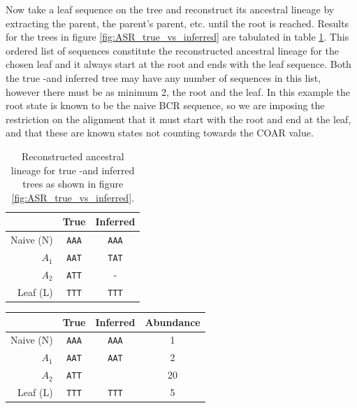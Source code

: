 Now take a leaf sequence on the tree and reconstruct its ancestral lineage by extracting the parent, the parent's parent, etc. until the root is reached.
Results for the trees in figure \ref{fig:ASR_true_vs_inferred} are tabulated in table \ref{true_vs_inferred_table}.
This ordered list of sequences constitute the reconstructed ancestral lineage for the chosen leaf and it always start at the root and ends with the leaf sequence.
Both the true -and inferred tree may have any number of sequences in this list, however there must be as minimum 2, the root and the leaf.
In this example the root state is known to be the naive BCR sequence, so we are imposing the restriction on the alignment that it must start with the root and end at the leaf, and that these are known states not counting towards the COAR value.


\begin{table}[ht!]
\centering
\begin{tabular}{rcc}
\multicolumn{1}{c}{} & True   & Inferred \\ \hline
Naive (N)            & \texttt{AAA} & \texttt{AAA}         \\ \hline
$A_1$                & \texttt{AAT} & \texttt{TAT}         \\ \hline
$A_2$                & \texttt{ATT} & -                    \\ \hline
Leaf (L)             & \texttt{TTT} & \texttt{TTT}         \\ \hline
\end{tabular}
    \caption{
         \label{true_vs_inferred_table}
             Reconstructed ancestral lineage for true -and inferred trees as shown in figure \ref{fig:ASR_true_vs_inferred}.
             }
\end{table}

\iffalse

\begin{table}[ht!]
\centering
\label{table:true_vs_inferred_table}
\begin{tabular}{rccc}
\multicolumn{1}{c}{} & True   & Inferred & Abundance \\ \hline
Naive (N)            & \texttt{AAA} & \texttt{AAA}   & 1         \\ \hline
$A_1$                & \texttt{AAT} & \texttt{AAT}   & 2         \\ \hline
$A_2$                & \texttt{ATT} &                  & 20        \\ \hline
Leaf (L)             & \texttt{TTT} & \texttt{TTT}   & 5         \\ \hline
\end{tabular}
\end{table}

